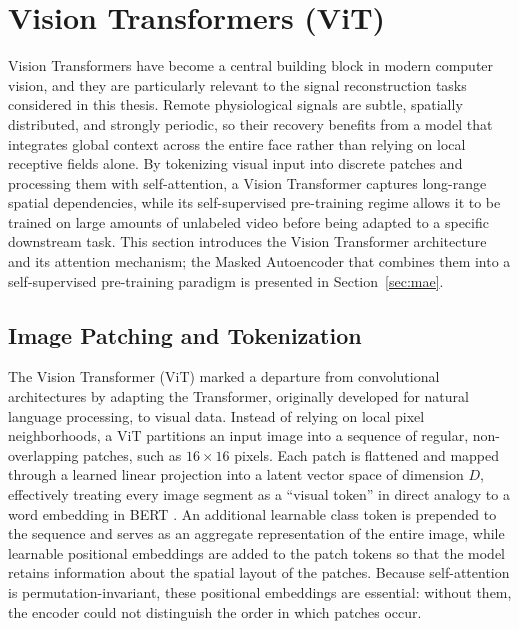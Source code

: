 \section{Vision Transformers (ViT)}
\label{sec:vit}

Vision Transformers have become a central building block in modern computer
vision, and they are particularly relevant to the signal reconstruction tasks
considered in this thesis. Remote physiological signals are subtle, spatially
distributed, and strongly periodic, so their recovery benefits from a model that
integrates global context across the entire face rather than relying on local
receptive fields alone. By tokenizing visual input into discrete patches and
processing them with self-attention, a Vision Transformer captures long-range
spatial dependencies, while its self-supervised pre-training regime allows it to
be trained on large amounts of unlabeled video before being adapted to a
specific downstream task. This section introduces the Vision Transformer
architecture and its attention mechanism; the Masked Autoencoder that combines
them into a self-supervised pre-training paradigm is presented in
Section~\ref{sec:mae}.

\subsection{Image Patching and Tokenization}
The Vision Transformer (ViT) \cite{dosovitskiy2021image} marked a departure from
convolutional architectures by adapting the Transformer, originally developed
for natural language processing, to visual data. Instead of relying on local
pixel neighborhoods, a ViT partitions an input image into a sequence of regular,
non-overlapping patches, such as $16 \times 16$ pixels. Each patch is flattened
and mapped through a learned linear projection into a latent vector space of
dimension $D$, effectively treating every image segment as a ``visual token'' in
direct analogy to a word embedding in BERT \cite{devlin-etal-2019-bert}. An
additional learnable class token is prepended to the sequence and serves as an
aggregate representation of the entire image, while learnable positional
embeddings are added to the patch tokens so that the model retains information
about the spatial layout of the patches. Because self-attention is
permutation-invariant, these positional embeddings are essential: without them,
the encoder could not distinguish the order in which patches occur.

